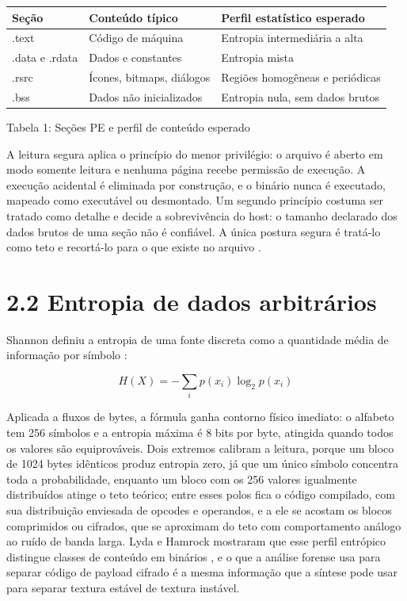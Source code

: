 \documentclass[11pt,a4paper]{article}
\begin{document}
\begin{center}
\scriptsize
\setlength{\tabcolsep}{4pt}
\begin{tabular}{p{}|p{}|p{}}
\hline
\textbf{Seção} & \textbf{Conteúdo típico} & \textbf{Perfil estatístico esperado} \\
\hline
.text & Código de máquina & Entropia intermediária a alta \\
.data e .rdata & Dados e constantes & Entropia mista \\
.rsrc & Ícones, bitmaps, diálogos & Regiões homogêneas e periódicas \\
.bss & Dados não inicializados & Entropia nula, sem dados brutos \\
\hline
\end{tabular}
\end{center}
\noindent Tabela 1: Seções PE e perfil de conteúdo esperado\par
\label{tab:1}
\vspace{2pt}{\footnotesize\noindent Autores\par}

A leitura segura aplica o princípio do menor privilégio: o arquivo é aberto em modo somente leitura e nenhuma página recebe permissão de execução. A execução acidental é eliminada por construção, e o binário nunca é executado, mapeado como executável ou desmontado. Um segundo princípio costuma ser tratado como detalhe e decide a sobrevivência do host: o tamanho declarado dos dados brutos de uma seção não é confiável. A única postura segura é tratá-lo como teto e recortá-lo para o que existe no arquivo \cite{kleidermacher2012}.


\section*{2.2 Entropia de dados arbitrários}

Shannon definiu a entropia de uma fonte discreta como a quantidade média de informação por símbolo \cite{shannon1948}:


\begin{equation}
H(X) = -\sum_i p(x_i) \log_2 p(x_i)
\label{eq:shannon}
\end{equation}

Aplicada a fluxos de bytes, a fórmula ganha contorno físico imediato: o alfabeto tem 256 símbolos e a entropia máxima é 8 bits por byte, atingida quando todos os valores são equiprováveis. Dois extremos calibram a leitura, porque um bloco de 1024 bytes idênticos produz entropia zero, já que um único símbolo concentra toda a probabilidade, enquanto um bloco com os 256 valores igualmente distribuídos atinge o teto teórico; entre esses polos fica o código compilado, com sua distribuição enviesada de opcodes e operandos, e a ele se acostam os blocos comprimidos ou cifrados, que se aproximam do teto com comportamento análogo ao ruído de banda larga. Lyda e Hamrock mostraram que esse perfil entrópico distingue classes de conteúdo em binários \cite{lyda2007}, e o que a análise forense usa para separar código de payload cifrado é a mesma informação que a síntese pode usar para separar textura estável de textura instável.
\end{document}
